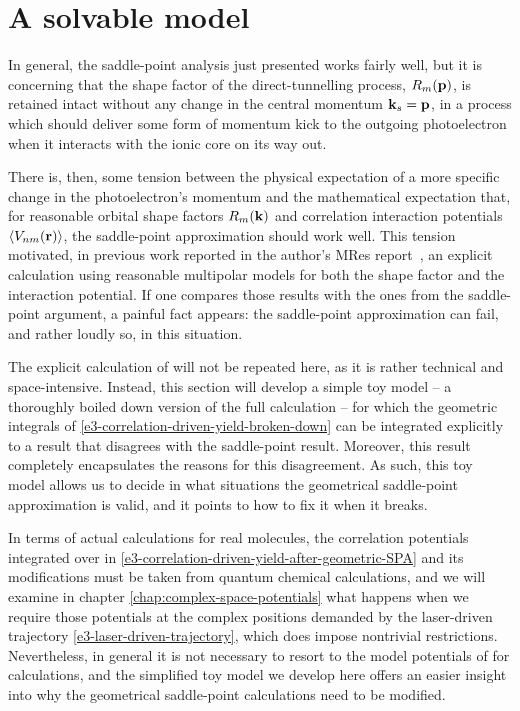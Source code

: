 




\section{A solvable model}
In general, the saddle-point analysis just presented works fairly well, but it is concerning that the shape factor of the direct-tunnelling process, $R_m(\vb{p})$, is retained intact without any change in the central momentum $\vb{k}_s=\vb{p}$, in a process which should deliver some form of momentum kick to the outgoing photoelectron when it interacts with the ionic core on its way out. 

There is, then, some tension between the physical expectation of a more specific change in the photoelectron's momentum and the mathematical expectation that, for reasonable orbital shape factors $R_m(\vb{k})$ and correlation interaction potentials $\left\langle V_{nm}\mathopen{}\left( \vb{r} \right)\mathclose{} \right\rangle$, the saddle-point approximation should work well. This tension motivated, in previous work reported in the author's MRes report~\cite{MResReport}, an explicit calculation using reasonable multipolar models for both the shape factor and the interaction potential. If one compares those results with the ones from the saddle-point argument, a painful fact appears: the saddle-point approximation can fail, and rather loudly so, in this situation.

The explicit calculation of  will not be repeated here, as it is rather technical and space-intensive. Instead, this section will develop a simple toy model -- a thoroughly boiled down version of the full calculation -- for which the geometric integrals of \eqref{e3-correlation-driven-yield-broken-down} can be integrated explicitly to a result that disagrees with the saddle-point result. Moreover, this result completely encapsulates the reasons for this disagreement. As such, this toy model allows us to decide in what situations the geometrical saddle-point approximation is valid, and it points to how to fix it when it breaks. 

In terms of actual calculations for real molecules, the correlation potentials integrated over in \eqref{e3-correlation-driven-yield-after-geometric-SPA} and its modifications must be taken from quantum chemical calculations, and we will examine in chapter \ref{chap:complex-space-potentials} what happens when we require those potentials at the complex positions demanded by the laser-driven trajectory \eqref{e3-laser-driven-trajectory}, which does impose nontrivial restrictions. Nevertheless, in general it is not necessary to resort to the model potentials of  for calculations, and the simplified toy model we develop here offers an easier insight into why the geometrical saddle-point calculations need to be modified.

